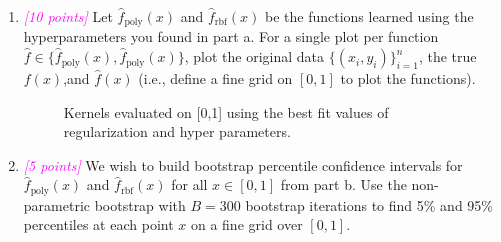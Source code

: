 \documentclass{article}
\newcommand{\1}{\mathbf{1}}
\newcommand{\points}[1]{\small\textcolor{magenta}{\emph{[#1 points]}} \normalsize}
\begin{document}
\begin{enumerate}
    \newpage
    \item \points{10} Let $\widehat f_{\text{poly}}(x)$ and $\widehat f_{\text{rbf}} (x)$ be the functions learned using the hyperparameters you found in part a. For a single plot per function $\widehat f\in \{\widehat f_{\text{poly}}(x), \widehat f_{\text{poly}}(x)\}$, plot the original data $\{(x_i,y_i)\}^n_{i=1}$, the true $f(x)$,and $\widehat f(x)$ (i.e., define a fine grid on $[0,1]$ to plot the functions). 
    \begin{figure}[h!]
    \centering 
        \caption{Kernels evaluated on [0,1] using the best fit values of regularization and hyper parameters.}
    \end{figure}
    

    \item \points{5} We wish to build bootstrap percentile confidence intervals for $\widehat f_{\text{poly}}(x)$ and $\widehat f_{\text{rbf}}(x)$ for all $x\in[0,1]$ from part b. Use the non-parametric bootstrap with $B=300$ bootstrap iterations to find 5\% and 95\% percentiles at each point $x$ on a fine grid over $[0,1]$. 
    

\end{enumerate}
\end{document}
